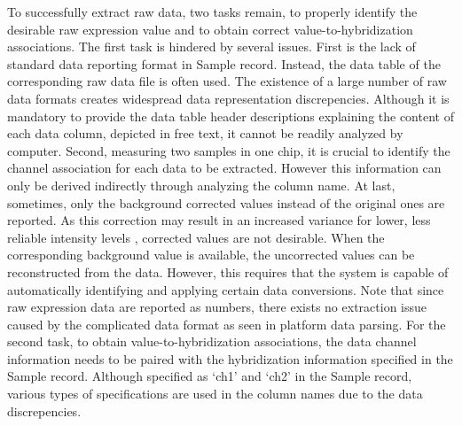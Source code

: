 To successfully extract raw data, two tasks remain, to properly identify the
desirable raw expression value and to obtain correct value-to-hybridization
associations.
%
The first task is hindered by several issues. 
%
First is the lack of standard data reporting format in Sample record.
Instead, the data table of the corresponding raw data file is often used.
%
The existence of a large number of raw data formats creates widespread data
representation discrepencies.
%
Although it is mandatory to provide the data table header descriptions
explaining the content of each data column, depicted in free text, it cannot
be readily analyzed by computer.
%
Second, measuring two samples in one chip, it is crucial to identify the
channel association for each data to be extracted.  However this information
can only be derived indirectly through analyzing the column name.
%
At last, sometimes, only the background corrected values instead of the
original ones are reported.  As this correction may result in an increased
variance for lower, less reliable intensity levels \cite{Ritchie ME,
  Bioinformatics, 2007;23:2700-2707}, corrected values are not desirable.
%
When the corresponding background value is available, the uncorrected values
can be reconstructed from the data.  However, this requires that the system is
capable of automatically identifying and applying certain data conversions.
%
Note that since raw expression data are reported as numbers, there exists no
extraction issue caused by the complicated data format as seen in platform data
parsing.
%
For the second task, to obtain value-to-hybridization associations, the data
channel information needs to be paired with the hybridization information
specified in the Sample record.
%
Although specified as `ch1' and `ch2' in the Sample record, various types of 
specifications are used in the column names due to the data discrepencies. 


